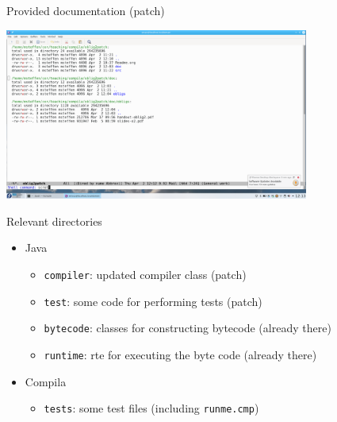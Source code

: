 \documentclass{beamer}
\begin{document}
\begin{frame}[label={sec:orgb1c722e}]{Provided documentation (patch)}

\begin{center}
 \includegraphics[width=0.75\textwidth]{figures/snaps/directorystructure-doc}
\end{center}
\end{frame}



\begin{frame}[label={sec:org657392d},fragile]{Relevant directories}
 \begin{itemize}
\item Java

\begin{itemize}
\item \texttt{compiler}: updated compiler class (patch)
\item \texttt{test}:   some code for performing tests (patch)
\item \texttt{bytecode}: classes for constructing bytecode (already there)
\item \texttt{runtime}: rte for executing the byte code (already there)
\end{itemize}

\item Compila

\begin{itemize}
\item \texttt{tests}: some test files (including \texttt{runme.cmp})
\end{itemize}
\end{itemize}
\end{frame}
\end{document}
